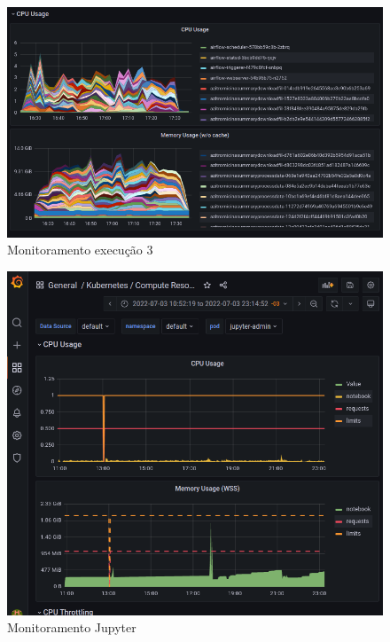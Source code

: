 \documentclass[10pt,brazil]{beamer}
\theoremstyle{definition}
\begin{document}
\begin{frame}[plain]
  \hspace*{-10mm}
    \begin{figure}
    \centering  
  \includegraphics[width=.75\paperwidth]{etl_3_usage.png}
      \caption[Monitoramento execução 3]{Monitoramento execução 3}
  \end{figure}  
\end{frame}

\begin{frame}[plain]
  \hspace*{-10mm}
    \begin{figure}
    \centering  
  \includegraphics[width=.6\paperwidth]{jupyter_consumption.png}
      \caption[Monitoramento Jupyter]{Monitoramento Jupyter}
  \end{figure}  
\end{frame}
\end{document}
